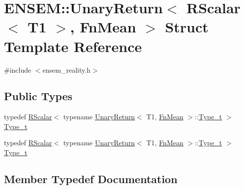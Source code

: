 \hypertarget{structENSEM_1_1UnaryReturn_3_01RScalar_3_01T1_01_4_00_01FnMean_01_4}{}\section{E\+N\+S\+EM\+:\+:Unary\+Return$<$ R\+Scalar$<$ T1 $>$, Fn\+Mean $>$ Struct Template Reference}
\label{structENSEM_1_1UnaryReturn_3_01RScalar_3_01T1_01_4_00_01FnMean_01_4}


{\ttfamily \#include $<$ensem\+\_\+reality.\+h$>$}

\subsection*{Public Types}
\begin{DoxyCompactItemize}
\item 
typedef \mbox{\hyperlink{classENSEM_1_1RScalar}{R\+Scalar}}$<$ typename \mbox{\hyperlink{structENSEM_1_1UnaryReturn}{Unary\+Return}}$<$ T1, \mbox{\hyperlink{structENSEM_1_1FnMean}{Fn\+Mean}} $>$\+::\mbox{\hyperlink{structENSEM_1_1UnaryReturn_3_01RScalar_3_01T1_01_4_00_01FnMean_01_4_a16f842b2df05b5909c08ddde22ca69f8}{Type\+\_\+t}} $>$ \mbox{\hyperlink{structENSEM_1_1UnaryReturn_3_01RScalar_3_01T1_01_4_00_01FnMean_01_4_a16f842b2df05b5909c08ddde22ca69f8}{Type\+\_\+t}}
\item 
typedef \mbox{\hyperlink{classENSEM_1_1RScalar}{R\+Scalar}}$<$ typename \mbox{\hyperlink{structENSEM_1_1UnaryReturn}{Unary\+Return}}$<$ T1, \mbox{\hyperlink{structENSEM_1_1FnMean}{Fn\+Mean}} $>$\+::\mbox{\hyperlink{structENSEM_1_1UnaryReturn_3_01RScalar_3_01T1_01_4_00_01FnMean_01_4_a16f842b2df05b5909c08ddde22ca69f8}{Type\+\_\+t}} $>$ \mbox{\hyperlink{structENSEM_1_1UnaryReturn_3_01RScalar_3_01T1_01_4_00_01FnMean_01_4_a16f842b2df05b5909c08ddde22ca69f8}{Type\+\_\+t}}
\end{DoxyCompactItemize}


\subsection{Member Typedef Documentation}
\mbox{\label{structENSEM_1_1UnaryReturn_3_01RScalar_3_01T1_01_4_00_01FnMean_01_4_a16f842b2df05b5909c08ddde22ca69f8}} 
